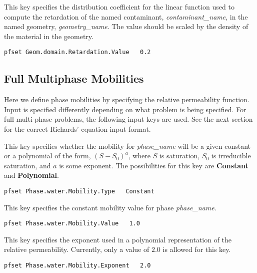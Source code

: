 {
This key specifies the distribution coefficient for the linear function
used to compute the retardation of the named contaminant,
{\em contaminant\_name}, in the named geometry, {\em geometry\_name}.
The value should be scaled by the density of the material in the
geometry.
}
\begin{display}\begin{verbatim}
pfset Geom.domain.Retardation.Value   0.2
\end{verbatim}\end{display}


\subsection{Full Multiphase Mobilities}

Here we define phase mobilities by specifying the
relative permeability function.  Input is specified differently depending on
what problem is being specified.  For full multi-phase problems, the following
input keys are used.  See the next section for the correct Richards' equation 
input format.

{
This key specifies whether the mobility for {\em phase\_name} will be a given
constant or a polynomial of the form,  
$(S - S_0)^{a}$, where $S$ is saturation, $S_0$ is
irreducible saturation, and $a$ is some exponent.
The possibilities for this key are {\bf Constant} and {\bf Polynomial}.
}
\begin{display}\begin{verbatim}
pfset Phase.water.Mobility.Type   Constant
\end{verbatim}\end{display}

{
This key specifies the constant mobility value for phase {\em phase\_name}.
}
\begin{display}\begin{verbatim}
pfset Phase.water.Mobility.Value   1.0
\end{verbatim}\end{display}

{
This key specifies the exponent used in a polynomial representation of the
relative permeability.  Currently, only a value of $2.0$ is allowed for this
key. 
}
\begin{display}\begin{verbatim}
pfset Phase.water.Mobility.Exponent   2.0
\end{verbatim}\end{display}

